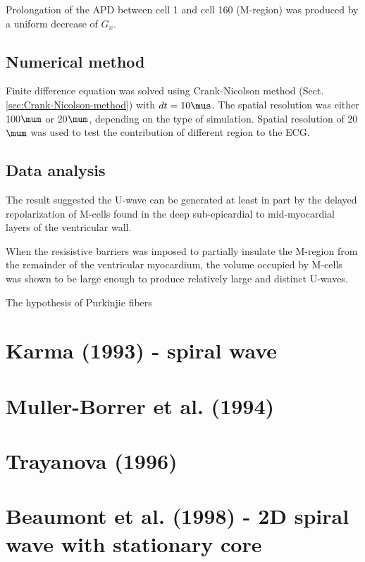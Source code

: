 Prolongation of the APD between cell 1 and cell 160 (M-region) was produced by a
uniform decrease of $G_x$.

\subsection{Numerical method}

Finite difference equation was solved using Crank-Nicolson method
(Sect.\ref{sec:Crank-Nicolson-method}) with $dt=10\mus$. The spatial resolution
was either 100$\mum$ or 20$\mum$, depending on the type of simulation. Spatial
resolution of 20$\mum$ was used to test the contribution of different region to
the ECG.

\subsection{Data analysis}

The result suggested the U-wave can be generated at least in part by the delayed
repolarization of M-cells found in the deep sub-epicardial to mid-myocardial
layers of the ventricular wall. 

When the resisistive barriers was imposed to partially insulate the M-region
from the remainder of the ventricular myocardium, the volume occupied by M-cells
was shown to be large enough to produce relatively large and distinct U-waves.

The hypothesis of Purkinjie fibers

\section{Karma (1993) - spiral wave}
\label{sec:karma1993}

\citep{Karma1993} 

\section{Muller-Borrer et al. (1994)}

\citep{muller-borrer1994}

\section{Trayanova (1996)}

\citep{trayanova1996}  

\section{Beaumont et al. (1998) - 2D spiral wave with stationary core}
\label{sec:beaumont1998}


